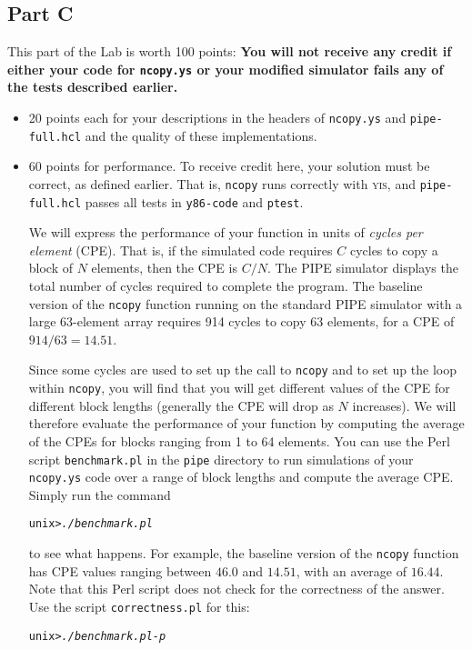 \documentclass[11pt]{article}
\newenvironment{codefrag}%
{\small\begin{alltt}}%
{\end{alltt}%
}
\begin{document}
\subsection*{Part C}
This part of the Lab is worth 100 points: 
{\bf You will not receive any credit if either your code 
for {\tt ncopy.ys} or your 
modified simulator fails any of the tests described earlier.}
\begin{itemize}
\item 20 points each for 
your descriptions in the headers of \texttt{ncopy.ys} and 
\texttt{pipe-full.hcl} and the quality of these implementations.

\item 60 points for performance. To receive credit here, your
solution must be correct, as defined earlier. That is, \texttt{ncopy}
runs correctly with \textsc{yis}, and \texttt{pipe-full.hcl} passes
all tests in {\tt y86-code} and \texttt{ptest}.

We will express the performance of your function in units of {\em
cycles per element} (CPE).  That is, if the simulated code requires
$C$ cycles to copy a block of $N$ elements, then the CPE is $C/N$.
The PIPE simulator displays the total number of cycles required to
complete the program.  The baseline version of the
\texttt{ncopy} function running on the standard PIPE simulator with a
large 63-element array requires 914 cycles to copy 63 elements, for a
CPE of $914/63 = 14.51$.

Since some cycles are used to set up the call to \texttt{ncopy} and to
set up the loop within \texttt{ncopy}, you will find that you will get
different values of the CPE for different block lengths (generally the
CPE will drop as $N$ increases).  We will therefore evaluate the
performance of your function by computing the average of the CPEs for
blocks ranging from 1 to 64 elements.  You can use the Perl script
\texttt{benchmark.pl} in the {\tt pipe} directory
to run simulations of your {\tt ncopy.ys}
code over a range of block lengths and compute the average CPE\@.
Simply run the command
\begin{codefrag}
unix> {\em ./benchmark.pl}
\end{codefrag}
to see what happens.  For example, the baseline version of the
\texttt{ncopy} function has CPE values ranging between $46.0$ and
$14.51$, with an average of $16.44$.  Note that this Perl script does
not check for the correctness of the answer.  Use the script
\texttt{correctness.pl} for this:
\begin{codefrag}
unix> {\em ./benchmark.pl -p}
\end{codefrag}
 


\end{itemize}
\end{document}
